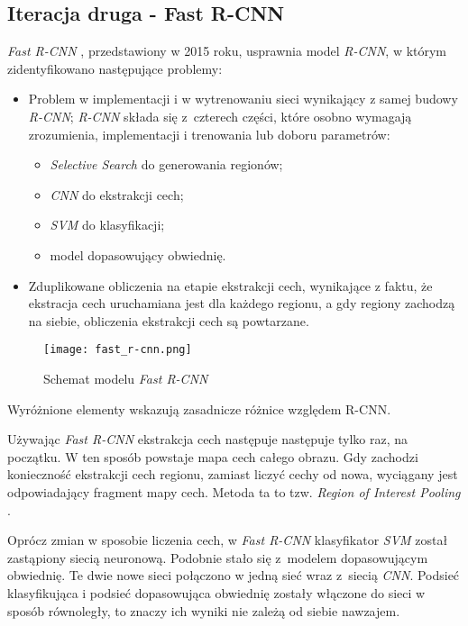 \subsection{Iteracja druga - Fast R-CNN}

\textit{Fast R-CNN} \cite{fast-rcnn}, przedstawiony w 2015 roku, usprawnia model \textit{R-CNN}, w którym zidentyfikowano następujące problemy:

\begin{itemize}
  \item Problem w implementacji i w wytrenowaniu sieci wynikający z samej budowy \textit{R-CNN}; \textit{R-CNN} składa się z~czterech części, które osobno wymagają zrozumienia, implementacji i trenowania lub doboru parametrów:
		\begin{itemize}
			\item \textit{Selective Search} do generowania regionów;
			\item \textit{CNN} do ekstrakcji cech;
			\item \textit{SVM} do klasyfikacji;
			\item model dopasowujący obwiednię.
		\end{itemize}
  \item Zduplikowane obliczenia na etapie ekstrakcji cech, wynikające z faktu, że ekstracja cech uruchamiana jest dla każdego regionu, a gdy regiony zachodzą na siebie, obliczenia ekstrakcji cech są powtarzane.
\end{itemize}

\begin{figure}[h]
  \centering
  \texttt{[image: fast\_r-cnn.png]}
  \caption{Schemat modelu \textit{Fast R-CNN}}
  \label{fig:fast_r_cnn}
\end{figure}

Wyróżnione elementy wskazują zasadnicze różnice względem R-CNN.

Używając \textit{Fast R-CNN} ekstrakcja cech następuje następuje tylko raz, na początku.
W ten sposób powstaje mapa cech całego obrazu.
Gdy zachodzi konieczność ekstrakcji cech regionu, zamiast liczyć cechy od nowa, wyciągany jest odpowiadający fragment mapy cech.
Metoda ta to tzw. \textit{Region of Interest Pooling} \cite{fast-rcnn}.

Oprócz zmian w sposobie liczenia cech, w \textit{Fast R-CNN} klasyfikator \textit{SVM} został zastąpiony siecią neuronową.
Podobnie stało się z~modelem dopasowującym obwiednię.
Te dwie nowe sieci połączono w jedną sieć wraz z~siecią \textit{CNN}.
Podsieć klasyfikująca i podsieć dopasowująca obwiednię zostały włączone do sieci w sposób równoległy, to znaczy ich wyniki nie zależą od siebie nawzajem.

